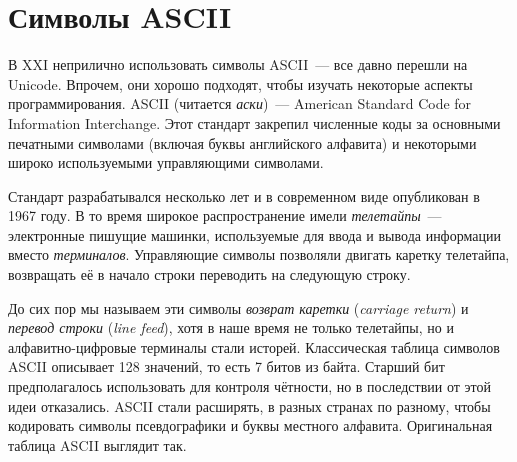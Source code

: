 \chapter{Символы ASCII}

В XXI неприлично использовать символы ASCII~--- все давно перешли на Unicode.
Впрочем, они хорошо подходят, чтобы изучать некоторые аспекты программирования.
ASCII (читается {\em аски})~--- American Standard Code for Information Interchange.
Этот стандарт закрепил численные коды за основными печатными символами (включая буквы английского алфавита) и некоторыми широко используемыми управляющими символами.

Стандарт разрабатывался несколько лет и в современном виде опубликован в 1967 году.
В то время широкое распространение имели {\em телетайпы}~--- электронные пишущие машинки, используемые для ввода и вывода информации вместо {\em терминалов}.
Управляющие символы позволяли двигать каретку телетайпа, возвращать её в начало строки переводить на следующую строку.

До сих пор мы называем эти символы {\em возврат каретки} ({\em carriage return}) и {\em перевод строки} ({\em line feed}), хотя в наше время не только телетайпы, но и алфавитно-цифровые терминалы стали исторей.
Классическая таблица символов ASCII описывает 128 значений, то есть 7 битов из байта. Старший бит предполагалось использовать для контроля чётности, но в последствии от этой идеи отказались. ASCII стали расширять, в разных странах по разному, чтобы кодировать символы псевдографики и буквы местного алфавита.
Оригинальная таблица ASCII выглядит так.

